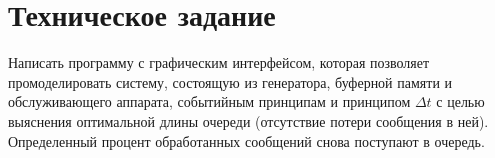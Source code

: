 \chapter{Техническое задание}

Написать программу с графическим интерфейсом, которая позволяет промоделировать систему, состоящую из генератора, буферной памяти и обслуживающего аппарата, событийным принципам и принципом $\Delta t$ с целью выяснения оптимальной длины очереди (отсутствие потери сообщения в ней). 
Определенный процент обработанных сообщений снова поступают в очередь.